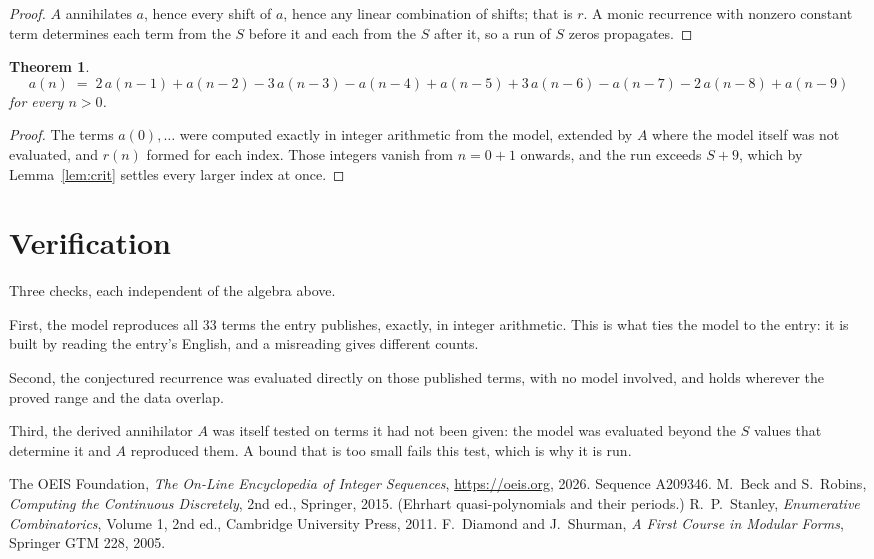 \documentclass[11pt,a4paper]{article}
\theoremstyle{plain}
\newtheorem{theorem}{Theorem}
\theoremstyle{definition}
\begin{document}
\begin{proof}
$A$ annihilates $a$, hence every shift of $a$, hence any linear combination of shifts; that is
$r$. A monic recurrence with nonzero constant term determines each term from the $S$ before it
and each from the $S$ after it, so a run of $S$ zeros propagates.
\end{proof}

\begin{theorem}
\[
a(n)\;=\;2\,a(n-1) + a(n-2) - 3\,a(n-3) - a(n-4) + a(n-5) + 3\,a(n-6) - a(n-7) - 2\,a(n-8) + a(n-9)
\]
for every $n>0$.
\end{theorem}

\begin{proof}
The terms $a(0),\dots$ were computed exactly in integer arithmetic from the model, extended by
$A$ where the model itself was not evaluated, and $r(n)$ formed for each index. Those integers
vanish from $n=0+1$ onwards, and the run exceeds $S+9$, which by
Lemma~\ref{lem:crit} settles every larger index at once.
\end{proof}

\section{Verification}

Three checks, each independent of the algebra above.

First, the model reproduces all $33$ terms the entry publishes, exactly, in integer
arithmetic. This is what ties the model to the entry: it is built by reading the entry's
English, and a misreading gives different counts.

Second, the conjectured recurrence was evaluated directly on those published terms, with no
model involved, and holds wherever the proved range and the data overlap.

Third, the derived annihilator $A$ was itself tested on terms it had not been given: the model
was evaluated beyond the $S$ values that determine it and $A$ reproduced them. A bound that is
too small fails this test, which is why it is run.

\begin{thebibliography}{9}
 The OEIS Foundation, \emph{The On-Line Encyclopedia of Integer
Sequences}, \url{https://oeis.org}, 2026. Sequence A209346.
 M.~Beck and S.~Robins, \emph{Computing the Continuous Discretely},
2nd ed., Springer, 2015. (Ehrhart quasi-polynomials and their periods.)
 R.~P.~Stanley, \emph{Enumerative Combinatorics}, Volume 1, 2nd ed.,
Cambridge University Press, 2011.
 F.~Diamond and J.~Shurman, \emph{A First Course in Modular Forms},
Springer GTM 228, 2005.
\end{thebibliography}
\end{document}
